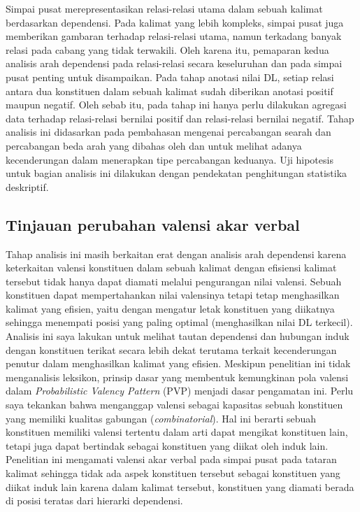 Simpai pusat merepresentasikan relasi-relasi utama dalam sebuah kalimat berdasarkan dependensi. Pada kalimat yang lebih kompleks, simpai pusat juga memberikan gambaran terhadap relasi-relasi utama, namun terkadang banyak relasi pada cabang yang tidak terwakili. Oleh karena itu, pemaparan kedua analisis arah dependensi pada relasi-relasi secara keseluruhan dan pada simpai pusat penting untuk disampaikan. Pada tahap anotasi nilai DL, setiap relasi antara dua konstituen dalam sebuah kalimat sudah diberikan anotasi positif maupun negatif. Oleh sebab itu, pada tahap ini hanya perlu dilakukan agregasi data terhadap relasi-relasi bernilai positif dan relasi-relasi bernilai negatif. Tahap analisis ini didasarkan pada pembahasan mengenai percabangan searah dan percabangan beda arah yang dibahas oleh \cite{temperley2008dependency} dan \cite{dryer1992greenbergian} untuk melihat adanya kecenderungan dalam menerapkan tipe percabangan keduanya. Uji hipotesis untuk bagian analisis ini dilakukan dengan pendekatan penghitungan statistika deskriptif.

\subsection{Tinjauan perubahan valensi akar verbal}
Tahap analisis ini masih berkaitan erat dengan analisis arah dependensi karena keterkaitan valensi konstituen dalam sebuah kalimat dengan efisiensi kalimat tersebut tidak hanya dapat diamati melalui pengurangan nilai valensi. Sebuah konstituen dapat mempertahankan nilai valensinya tetapi tetap menghasilkan kalimat yang efisien, yaitu dengan mengatur letak konstituen yang diikatnya sehingga menempati posisi yang paling optimal (menghasilkan nilai DL terkecil). Analisis ini saya lakukan untuk melihat tautan dependensi dan hubungan induk dengan konstituen terikat secara lebih dekat terutama terkait kecenderungan penutur dalam menghasilkan kalimat yang efisien. Meskipun penelitian ini tidak menganalisis leksikon, prinsip dasar yang membentuk kemungkinan pola valensi dalam \textit{Probabilistic Valency Pattern} (PVP) \citep{liu2006syntactic} menjadi dasar pengamatan ini. Perlu saya tekankan bahwa \cite{liu2006syntactic} menganggap valensi sebagai kapasitas sebuah konstituen yang memiliki kualitas gabungan (\textit{combinatorial}). Hal ini berarti sebuah konstituen memiliki valensi tertentu dalam arti dapat mengikat konstituen lain, tetapi juga dapat bertindak sebagai konstituen yang diikat oleh induk lain. Penelitian ini mengamati valensi akar verbal pada simpai pusat pada tataran kalimat sehingga tidak ada aspek konstituen tersebut sebagai konstituen yang diikat induk lain karena dalam kalimat tersebut, konstituen yang diamati berada di posisi teratas dari hierarki dependensi.

